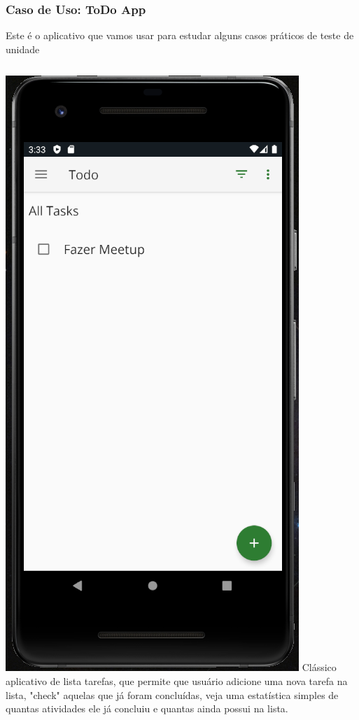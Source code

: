 \documentclass{beamer}
\begin{document}
\begin{frame}
	\frametitle{Caso de Uso: ToDo App}
	Este é o aplicativo que vamos usar para estudar alguns casos práticos de teste de unidade
	\begin{columns}[c]
		
		\includegraphics[scale=0.3]{toDoAppSample}
		Clássico aplicativo de lista tarefas, que permite que usuário adicione uma nova tarefa na lista, "check" aquelas que já foram concluídas, veja uma estatística simples de quantas atividades ele já concluiu e quantas ainda possui na lista.
		
	\end{columns}
	
\end{frame}
\end{document}
